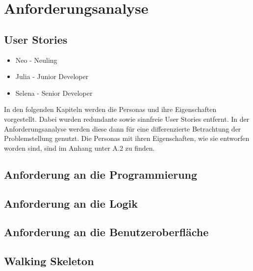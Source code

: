 \chapter{Anforderungsanalyse}

\section{User Stories}

\begin{itemize}
    \item Neo - Neuling
    \item Julia - Junior Developer
    \item Selena - Senior Developer
\end{itemize}

In den folgenden Kapiteln werden die Personas und ihre Eigenschaften vorgestellt. Dabei wurden redundante sowie sinnfreie User Stories entfernt. In der Anforderungsanalyse werden diese dann für eine differenzierte Betrachtung der Problemstellung genutzt. Die Personas mit ihren Eigenschaften, wie sie entworfen worden sind, sind im Anhang unter A.2 zu finden.

\section{Anforderung an die Programmierung}

\section{Anforderung an die Logik}

\section{Anforderung an die Benutzeroberfläche}

\section{Walking Skeleton}
